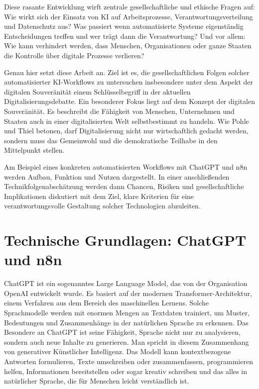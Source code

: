 \documentclass[utf8,biblatex]{bremerhaven_lni}
\begin{document}
Diese rasante Entwicklung wirft zentrale gesellschaftliche und ethische Fragen auf:
Wie wirkt sich der Einsatz von KI auf Arbeitsprozesse, Verantwortungsverteilung und Datenschutz aus?
Was passiert wenn automatisierte Systeme eigenständig Entscheidungen treffen und wer trägt dann die Verantwortung?
Und vor allem: Wie kann verhindert werden, dass Menschen, Organisationen oder ganze Staaten die Kontrolle über digitale Prozesse verlieren?

Genau hier setzt diese Arbeit an. Ziel ist es, die gesellschaftlichen Folgen solcher automatisierter KI-Workflows zu untersuchen insbesondere unter dem Aspekt der digitalen Souveränität einem Schlüsselbegriff in der aktuellen Digitalisierungsdebatte. Ein besonderer Fokus liegt auf dem Konzept der digitalen Souveränität. Es beschreibt die Fähigkeit von Menschen, Unternehmen und Staaten auch in einer digitalisierten Welt selbstbestimmt zu handeln. Wie Pohle und Thiel betonen, darf Digitalisierung nicht nur wirtschaftlich gedacht werden, sondern muss das Gemeinwohl und die demokratische Teilhabe in den Mittelpunkt stellen.

Am Beispiel eines konkreten automatisierten Workflows mit ChatGPT und n8n werden Aufbau, Funktion und Nutzen dargestellt. In einer anschließenden Technikfolgenabschätzung werden dann Chancen, Risiken und gesellschaftliche Implikationen diskutiert mit dem Ziel, klare Kriterien für eine verantwortungsvolle Gestaltung solcher Technologien abzuleiten.





\section{Technische Grundlagen: ChatGPT und n8n}
ChatGPT ist ein sogenanntes Large Language Model, das von der Organisation OpenAI entwickelt wurde. Es basiert auf der modernen Transformer-Architektur, einem Verfahren aus dem Bereich des maschinellen Lernens. Solche Sprachmodelle werden mit enormen Mengen an Textdaten trainiert, um Muster, Bedeutungen und Zusammenhänge in der natürlichen Sprache zu erkennen. Das Besondere an ChatGPT ist seine Fähigkeit, Sprache nicht nur zu analysieren, sondern auch neue Inhalte zu generieren. Man spricht in diesem Zusammenhang von generativer Künstlicher Intelligenz. Das Modell kann kontextbezogene Antworten formulieren, Texte umschreiben oder zusammenfassen, programmieren helfen, Informationen bereitstellen oder sogar kreativ schreiben und das alles in natürlicher Sprache, die für Menschen leicht verständlich ist.
\end{document}

